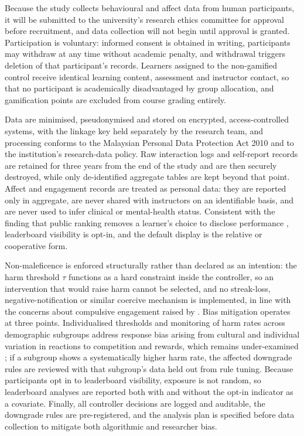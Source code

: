 \documentclass[12pt,a4paper]{article}
\begin{document}
\begin{justify}
Because the study collects behavioural and affect data from human participants, it will be submitted to the university's research ethics committee for approval before recruitment, and data collection will not begin until approval is granted. Participation is voluntary: informed consent is obtained in writing, participants may withdraw at any time without academic penalty, and withdrawal triggers deletion of that participant's records. Learners assigned to the non-gamified control receive identical learning content, assessment and instructor contact, so that no participant is academically disadvantaged by group allocation, and gamification points are excluded from course grading entirely.

Data are minimised, pseudonymised and stored on encrypted, access-controlled systems, with the linkage key held separately by the research team, and processing conforms to the Malaysian Personal Data Protection Act 2010 and to the institution's research-data policy. Raw interaction logs and self-report records are retained for three years from the end of the study and are then securely destroyed, while only de-identified aggregate tables are kept beyond that point. Affect and engagement records are treated as personal data: they are reported only in aggregate, are never shared with instructors on an identifiable basis, and are never used to infer clinical or mental-health status. Consistent with the finding that public ranking removes a learner's choice to disclose performance \parencite{edwards2022anxiety}, leaderboard visibility is opt-in, and the default display is the relative or cooperative form.

Non-maleficence is enforced structurally rather than declared as an intention: the harm threshold $\tau$ functions as a hard constraint inside the controller, so an intervention that would raise harm cannot be selected, and no streak-loss, negative-notification or similar coercive mechanism is implemented, in line with the concerns about compulsive engagement raised by \textcite{gul2026brainrot}. Bias mitigation operates at three points. Individualised thresholds and monitoring of harm rates across demographic subgroups address response bias arising from cultural and individual variation in reactions to competition and rewards, which remains under-examined \parencite{gao2024sdt,nugroho2025negative}; if a subgroup shows a systematically higher harm rate, the affected downgrade rules are reviewed with that subgroup's data held out from rule tuning. Because participants opt in to leaderboard visibility, exposure is not random, so leaderboard analyses are reported both with and without the opt-in indicator as a covariate. Finally, all controller decisions are logged and auditable, the downgrade rules are pre-registered, and the analysis plan is specified before data collection to mitigate both algorithmic and researcher bias.


\end{justify}
\end{document}
